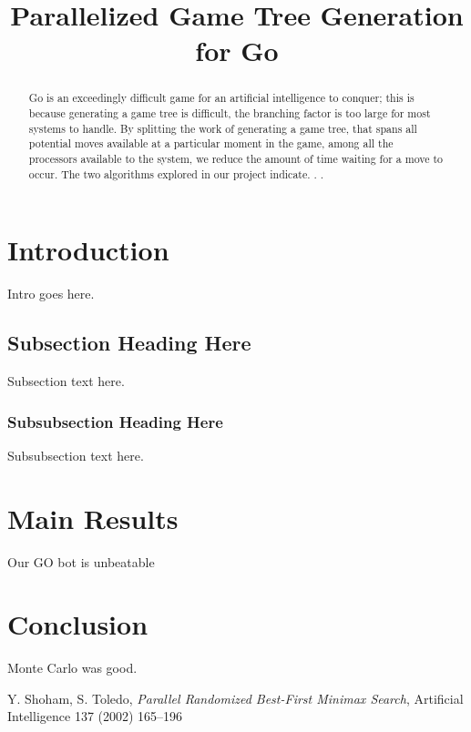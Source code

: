 \documentclass[conference]{IEEEtran}
\begin{document}
\title{Parallelized Game Tree Generation\\for Go}


\author{
}

\maketitle


\begin{abstract}
Go is an exceedingly difficult game for an artificial intelligence to conquer; this is because generating a game tree is difficult, the branching factor is too large for most systems to handle. By splitting the work of generating a game tree, that spans all potential moves available at a particular moment in the game, among all the processors available to the system, we reduce the amount of time waiting for a move to occur. The two algorithms explored in our project indicate. . .

\end{abstract}


\section{Introduction}
Intro goes here.


\subsection{Subsection Heading Here}
Subsection text here.


\subsubsection{Subsubsection Heading Here}
Subsubsection text here.


\section{Main Results}
Our GO bot is unbeatable


\section{Conclusion}
Monte Carlo was good.


\begin{thebibliography}{1}

Y. Shoham, S. Toledo, \emph{Parallel Randomized Best-First Minimax Search},  Artificial Intelligence 137 (2002) 165--196

\end{thebibliography}
\end{document}
